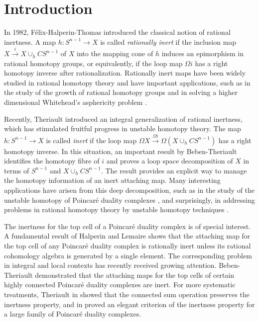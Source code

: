 \documentclass[a4]{amsart}
\theoremstyle{definition}
\begin{document}
\begin{sloppypar}
\section{Introduction}
In 1982, F\'{e}lix-Halperin-Thomas \cite{FHT82} introduced the classical notion of rational inertness. A map $h: S^{n-1}\stackrel{}{\longrightarrow} X$ is called {\it rationally inert} if the inclusion map $X\stackrel{i}{\longrightarrow} X\cup_h CS^{n-1}$ of $X$ into the mapping cone of $h$ induces an epimorphism in rational homotopy groups, or equivalently, if the loop map $\Omega i$ has a right homotopy inverse after rationalization. Rationally inert maps have been widely studied in rational homotopy theory \cite{FT89, HL87, HL95, HeL96, Bub05} and have important applications, such as in the study of the growth of rational homotopy groups \cite{FHT07} and in solving a higher dimensional Whitehead's asphericity problem \cite{Ani86}.


Recently, Theriault \cite{The24a} introduced an integral generalization of rational inertness, which has stimulated fruitful progress in unstable homotopy theory. The map $h: S^{n-1}\stackrel{}{\longrightarrow} X$ is called {\it inert} if the loop map $\Omega X\stackrel{\Omega i}{\longrightarrow} \Omega(X\cup_h CS^{n-1})$ has a right homotopy inverse. In this situation, an important result by Beben-Theriault \cite{BT22} identifies the homotopy fibre of $i$ and proves a loop space decomposition of $X$ in terms of $S^{n-1}$ and $X\cup_h CS^{n-1}$. The result provides an explicit way to manage the homotopy information of an inert attaching map. Many interesting applications have arisen from this deep decomposition, such as in the study of the unstable homotopy of Poincar\'{e} duality complexes \cite{Hua22, HT22, Hua23a, Hua24, The24a, The24b}, and surprisingly, in addressing problems in rational homotopy theory by unstable homotopy techniques \cite{Che23a, Che23b, Hua23b, HT24b}. 

The inertness for the top cell of a Poincar\'{e} duality complex is of special interest. A fundamental result of Halperin and Lemaire \cite{HL87} shows that the attaching map for the top cell of any Poincar\'{e} duality complex is rationally inert unless its rational cohomology algebra is generated by a single element. The corresponding problem in integral and local contexts has recently received growing attention. Beben-Theriault \cite{BT14, BT22} demonstrated that the attaching maps for the top cells of certain highly connected Poincar\'{e} duality complexes are inert. For more systematic treatments, Theriault in \cite{The24a} showed that the connected sum operation preserves the inertness property, and in \cite{The24b} proved an elegant criterion of the inertness property for a large family of Poincar\'{e} duality complexes.


\end{sloppypar}
\end{document}
